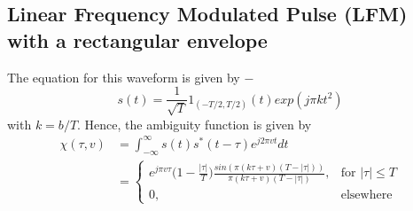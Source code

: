 \subsection*{ Linear Frequency Modulated Pulse (LFM) with a rectangular envelope } 
\noindent The equation for this waveform is given by $-$
\begin{equation}
 s(t) = \frac{1}{\sqrt{T}}1_{(-T/2,T/2)}(t) exp( j\pi k t^{2})
 \end{equation}
 \noindent with $k = b/T$. Hence, the ambiguity function is given by
 \begin{equation} \label{eq4}
\begin{split}
\chi(\tau,v) & = \int_{-\infty}^{\infty} s(t) s^{*}(t-\tau) e^{j2\pi vt}dt \\
& =  \begin{cases} e^{j\pi v \tau} \Big( 1 - \frac{|\tau|}{T} \Big) \frac{sin(\pi (k\tau + v)(T - |\tau|))}{\pi (k\tau + v)(T - |\tau|)}, & \mbox{for $|\tau| \leq T$} \\ 0, & \mbox{elsewhere} \end{cases} \\
\end{split}
\end{equation}
 

